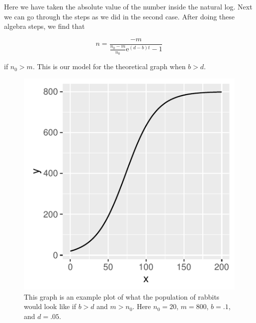 \documentclass{article}\usepackage[]{graphicx}\usepackage[]{color}
\makeatletter
\def\maxwidth{ %
  \ifdim\Gin@nat@width>\linewidth
    \linewidth
  \else
    \Gin@nat@width
  \fi
}
\newenvironment{knitrout}{}{} %
\makeatother
\begin{document}
\noindent Here we have taken the absolute value of the number inside the natural log. Next we can go through the steps as we did in the second case. After doing these algebra steps, we find that 

\begin{equation}
n= \frac{-m}{\frac{n_0-m}{n_0}\mathrm{e}^{(d-b)t}-1}
\end{equation}

\noindent if \(n_0 > m\). This is our model for the theoretical graph when \(b > d\).
\bigskip

\begin{figure}
\begin{knitrout}
\color{fgcolor}

{\centering \includegraphics[width=\maxwidth]{figure/unnamed-chunk-2-1} 

}



\end{knitrout}
\caption{This graph is an example plot of what the population of rabbits would look like if \(b > d\) and \(m > n_0\). Here \(n_0 = 20\), \(m = 800\), \(b = .1\), and \(d = .05\).}
\end{figure}
\end{document}
